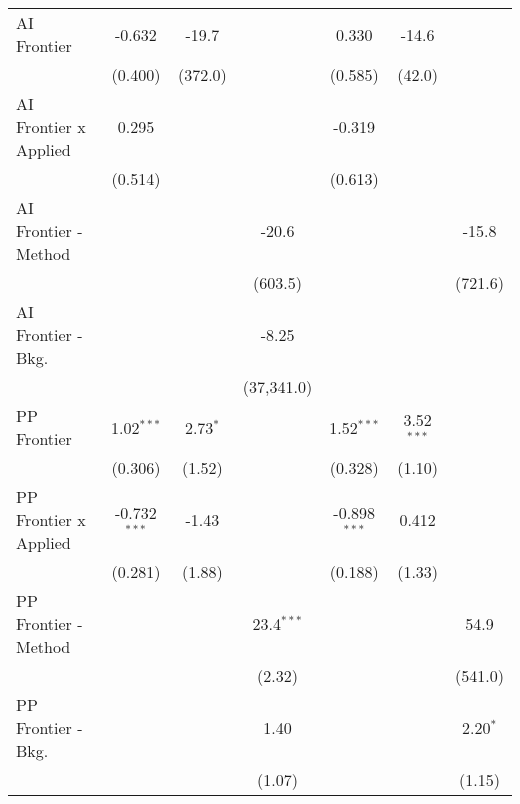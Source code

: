 \begin{tabular}{lcccccc}
   AI Frontier                    & -0.632         & -19.7      &               & 0.330          & -14.6        &   \\   
                                  & (0.400)        & (372.0)    &               & (0.585)        & (42.0)       &   \\   
   AI Frontier x Applied          & 0.295          &            &               & -0.319         &              &   \\   
                                  & (0.514)        &            &               & (0.613)        &              &   \\   
   AI Frontier - Method           &                &            & -20.6         &                &              & -15.8\\   
                                  &                &            & (603.5)       &                &              & (721.6)\\   
   AI Frontier - Bkg.             &                &            & -8.25         &                &              &   \\   
                                  &                &            & (37,341.0)    &                &              &   \\   
   PP Frontier                    & 1.02$^{***}$   & 2.73$^{*}$ &               & 1.52$^{***}$   & 3.52$^{***}$ &   \\   
                                  & (0.306)        & (1.52)     &               & (0.328)        & (1.10)       &   \\   
   PP Frontier x Applied          & -0.732$^{***}$ & -1.43      &               & -0.898$^{***}$ & 0.412        &   \\   
                                  & (0.281)        & (1.88)     &               & (0.188)        & (1.33)       &   \\   
   PP Frontier - Method           &                &            & 23.4$^{***}$  &                &              & 54.9\\   
                                  &                &            & (2.32)        &                &              & (541.0)\\   
   PP Frontier - Bkg.             &                &            & 1.40          &                &              & 2.20$^{*}$\\   
                                  &                &            & (1.07)        &                &              & (1.15)\\   

\end{tabular}
